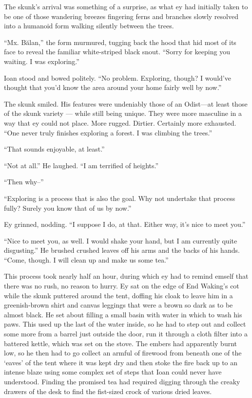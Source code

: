 The skunk's arrival was something of a surprise, as what ey had initially taken to be one of those wandering breezes fingering ferns and branches slowly resolved into a humanoid form walking silently between the trees.

``Mx. Bălan,'' the form murmured, tugging back the hood that hid most of its face to reveal the familiar white-striped black snout. ``Sorry for keeping you waiting. I was exploring.''

Ioan stood and bowed politely. ``No problem. Exploring, though? I would've thought that you'd know the area around your home fairly well by now.''

The skunk smiled. His features were undeniably those of an Odist---at least those of the skunk variety — while still being unique. They were more masculine in a way that ey could not place. More rugged. Dirtier. Certainly more exhausted. ``One never truly finishes exploring a forest. I was climbing the trees.''

``That sounds enjoyable, at least.''

``Not at all.'' He laughed. ``I am terrified of heights.''

``Then why--''

``Exploring is a process that is also the goal. Why not undertake that process fully? Surely you know that of us by now.''

Ey grinned, nodding. ``I suppose I do, at that. Either way, it's nice to meet you.''

``Nice to meet you, as well. I would shake your hand, but I am currently quite disgusting.'' He brushed crushed leaves off his arms and the backs of his hands. ``Come, though. I will clean up and make us some tea.''

This process took nearly half an hour, during which ey had to remind emself that there was no rush, no reason to hurry. Ey sat on the edge of End Waking's cot while the skunk puttered around the tent, doffing his cloak to leave him in a greenish-brown shirt and canvas leggings that were a brown so dark as to be almost black. He set about filling a small basin with water in which to wash his paws. This used up the last of the water inside, so he had to step out and collect some more from a barrel just outside the door, run it through a cloth filter into a battered kettle, which was set on the stove. The embers had apparently burnt low, so he then had to go collect an armful of firewood from beneath one of the `eaves' of the tent where it was kept dry and then stoke the fire back up to an intense blaze using some complex set of steps that Ioan could never have understood. Finding the promised tea had required digging through the creaky drawers of the desk to find the fist-sized crock of various dried leaves.


